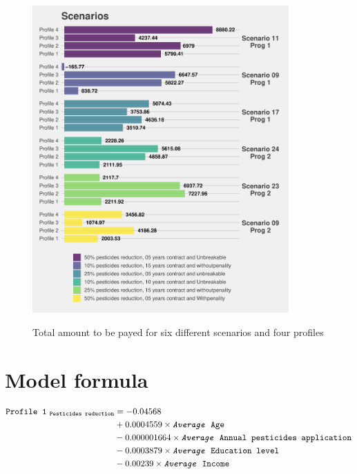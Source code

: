 \documentclass[12pt]{article}
\begin{document}
\begin{figure}[H]
 \centering
 \includegraphics[width=0.875\textwidth]{figures/scenarios.pdf}\\
 \caption{Total amount to be payed for six different scenarios and four
          profiles}
 \label{fig:scenarios}
\end{figure}

\section*{Model formula}

\begin{align*}
 \texttt{Profile 1}_{~\texttt{Pesticides reduction}}
 &= -0.04568\\
 &+ 0.0004559 \times \texttt{\textit{Average} Age}\\
 &- 0.000001664 \times \texttt{\textit{Average} Annual pesticides application}\\
 &- 0.0003879 \times \texttt{\textit{Average} Education level}\\
 &- 0.00239 \times \texttt{\textit{Average} Income}%
\end{align*}
\end{document}
